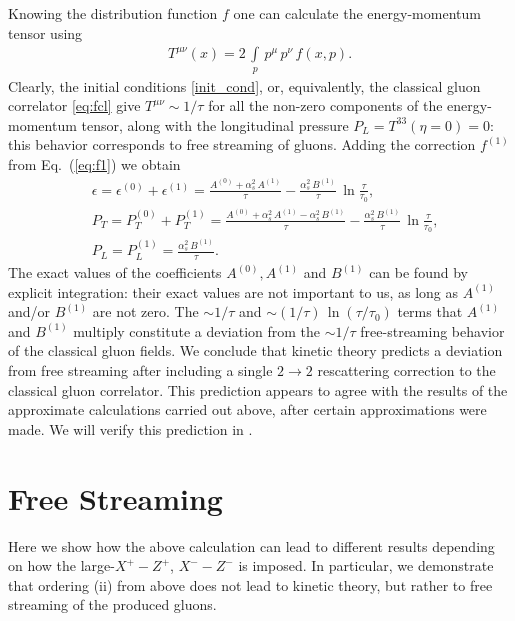 \documentclass[onecolumn,showpacs,nobibnotes,nofootinbib,12pt,aps,prd,showpacs,notitlepage,nofootinbib,preprintnumbers,amsmath,amssymb]{article}
\def\eq#1{{Eq.~(\ref{#1})}}
\newcommand{\as}{\alpha_s}
\begin{document}
Knowing the distribution function $f$ one can calculate the
energy-momentum tensor using
\begin{align}
  \label{eq:EMT}
  T^{\mu\nu} (x) = 2\, \int\limits_p \, p^\mu \, p^\nu \, f (x,p).
\end{align}
Clearly, the initial conditions \eqref{init_cond}, or, equivalently,
the classical gluon correlator \eqref{eq:fcl} give $T^{\mu\nu} \sim
1/\tau$ for all the non-zero components of the energy-momentum tensor,
along with the longitudinal pressure $P_L = T^{33} (\eta=0) = 0$: this
behavior corresponds to free streaming of gluons. Adding the
correction $f^{(1)}$ from \eq{eq:f1} we obtain
\begin{subequations}\label{eq:results}
\begin{align}
  & \epsilon = \epsilon^{(0)} + \epsilon^{(1)} = \frac{A^{(0)} + \as^2 \, A^{(1)}}{\tau} - \frac{\as^2 \, B^{(1)}}{\tau} \, \ln \frac{\tau}{\tau_0}, \\
  & P_T = P_T^{(0)} + P_T^{(1)} = \frac{A^{(0)} + \as^2 \, A^{(1)} - \as^2 \, B^{(1)}}{\tau} - \frac{\as^2 \, B^{(1)}}{\tau} \, \ln \frac{\tau}{\tau_0}, \\
  & P_L = P_L^{(1)} = \frac{\as^2 \, B^{(1)}}{\tau} .
\end{align}
\end{subequations}
The exact values of the coefficients $A^{(0)}, A^{(1)}$ and $B^{(1)}$
can be found by explicit integration: their exact values are not
important to us, as long as $A^{(1)}$ and/or $B^{(1)}$ are not
zero. The $\sim 1/\tau$ and $\sim (1/\tau) \, \ln (\tau/\tau_0)$ terms
that $A^{(1)}$ and $B^{(1)}$ multiply constitute a deviation from the
$\sim 1/\tau$ free-streaming behavior of the classical gluon
fields. We conclude that kinetic theory predicts a deviation from free
streaming after including a single $2 \to 2$ rescattering correction
to the classical gluon correlator. This prediction appears to agree
with the results of the approximate calculations carried out above,
after certain approximations were made. We will verify this prediction
in \cite{KovchegovWu}. 





\section{Free Streaming}
\label{sec:free}

Here we show how the above calculation can lead to different results
depending on how the large-$X^+ - Z^+$, $X^- - Z^-$ is imposed. In
particular, we demonstrate that ordering (ii) from above does not lead
to kinetic theory, but rather to free streaming of the produced
gluons.
\end{document}
